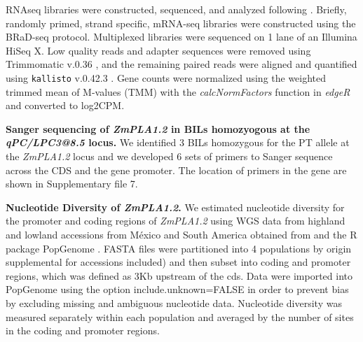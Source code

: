 \documentclass[9pt,twocolumn,twoside,lineno]{BioRxiv}
\begin{document}
RNAseq libraries were constructed, sequenced, and analyzed following \cite{Crow2020-gene}. 
Briefly, randomly primed, strand specific, mRNA-seq libraries were constructed using the BRaD-seq \cite{townsley2015brad} protocol.
Multiplexed libraries were sequenced on 1 lane of an Illumina HiSeq X. 
Low quality reads and adapter sequences were removed using Trimmomatic v.0.36 \cite{bolger2014trimmomatic}, and the remaining paired reads were aligned and quantified using \texttt{kallisto} v.0.42.3 \cite{bray2016near}. 
Gene counts were normalized using the weighted trimmed mean of M-values (TMM) with the \textit{calcNormFactors} function in \textit{edgeR} \cite{robinson2010edger} and converted to log2CPM.

\textbf{Sanger sequencing of \textit{ZmPLA1.2} in BILs homozyogous at the \textit{qPC/LPC3@8.5} locus.}
We identified 3 BILs homozygous for the PT allele at the \textit{ZmPLA1.2} locus and we developed 6 sets of primers to Sanger sequence across the CDS and the gene promoter. 
The location of primers in the gene are shown in Supplementary file 7. 

\textbf{Nucleotide Diversity of \textit{ZmPLA1.2}.}
We estimated nucleotide diversity for the promoter and coding regions of \textit{ZmPLA1.2} using WGS data from highland and lowland accessions from M\'exico and South America obtained from \cite{Wang2017-bc} and the R package PopGenome \cite{Pfeifer2014-bg}. %
FASTA files were partitioned into 4 populations by origin  supplemental for accessions included) and then subset into coding and promoter regions, which was defined as 3Kb upstream of the cds.  %
Data were imported into PopGenome using the option include.unknown=FALSE in order to prevent bias by excluding missing and ambiguous nucleotide data.
Nucleotide diversity was measured separately within each population and averaged by the number of sites in the coding and promoter regions.
\end{document}

